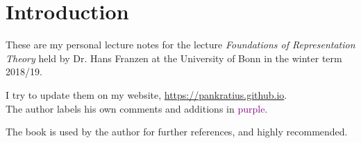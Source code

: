 \chapter*{Introduction}
These are my personal lecture notes for the lecture \textit{Foundations of Representation Theory} held by Dr. Hans Franzen at the University of Bonn in the winter term 2018/19.\par
I try to update them on my website, \url{https://pankratius.github.io}.\\
The author labels his own comments and additions in \textcolor{purple}{purple}.\par
The book \cite{aluffi} is used by the author for further references, and highly recommended.
